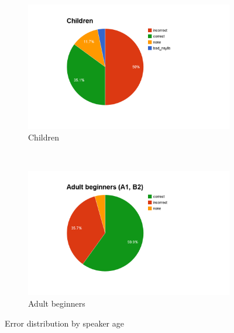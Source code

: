 			
			\begin{figure}[htb]
				\centering
				\begin{subfigure}[t]{0.5\textwidth}
					\includegraphics[width=\textwidth]{img/annotation/childPie}
					\caption{Children}
					\label{fig:results:agepies:child}
				\end{subfigure}%
				~
%		
				\begin{subfigure}[t]{0.5\textwidth}
					\includegraphics[width=\textwidth]{img/annotation/adultBeginnersPie}
					\caption{Adult beginners}
					\label{fig:results:agepies:adultbeg}
				\end{subfigure}%
				
				\caption{Error distribution by speaker age}
				\label{fig:results:agepies}
			\end{figure}	
			

